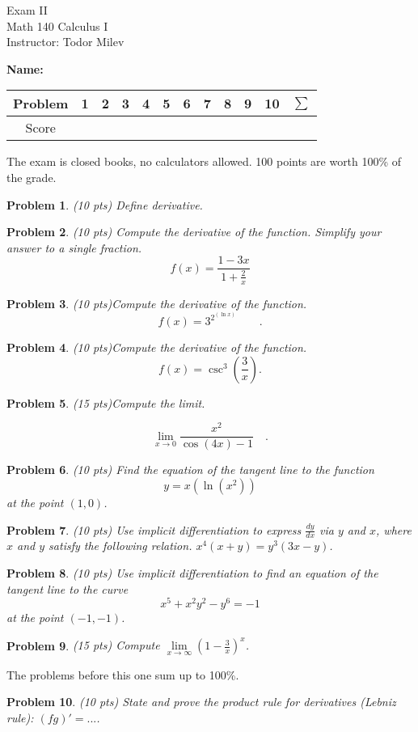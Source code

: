 \documentclass{article}
\newtheorem{problem}{Problem}
\begin{document}
\begin{center}
\Large
Exam II\\ Math 140 Calculus I \\ \normalsize Instructor: Todor Milev
\end{center}

\noindent \textbf{Name:} \hfill{~}
\begin{tabular}{c|c|c|c|c|c|c|c|c|c|c||c}
Problem&1 &2&3&4&5&6&7&8&9&10& $\sum$\\\hline
Score&&&&&&&&&&&
\end{tabular}

\noindent The exam is closed books, no calculators allowed. 100 points are worth 100\% of the grade.
\begin{problem}(10 pts) Define derivative.
\end{problem}

\vskip 8cm

\begin{problem}(10 pts)
Compute the derivative of the function. Simplify your answer to a single fraction.
\[f(x)=\frac{1-3x }{1+\frac{2}x}
\]
\end{problem}
\newpage
\begin{problem}(10 pts)Compute the derivative of the function.
\[
f(x)=3^{2^{(\ln x)}}\quad \quad.
\]
\end{problem}
\vskip 9cm

\begin{problem}(10 pts)Compute the derivative of the function.
\[f(x)= \csc^3 \left(\frac{3}{x}\right).
\]
\end{problem}

\newpage

\begin{problem}(15 pts)Compute the limit.

\[\lim\limits_{x\to 0}
\frac{x^2}{\cos(4x) -1} \quad .
\]

\end{problem}
\vskip 9cm


\begin{problem}(10 pts)
Find the equation of the tangent line to the function
\[
y=x(\ln (x^2))
\]
at the point $(1, 0)$.
\end{problem}

\newpage

\begin{problem}(10 pts)
Use implicit differentiation to express $\frac{dy}{dx}$ via $y $ and $x$, where $x$ and $y$ satisfy the following relation.
$x^4(x+y)=y^3(3x-y)$.
\end{problem}
\vskip 9cm

\begin{problem}(10 pts)
Use implicit differentiation to find an equation of the tangent line to the curve
\[
x^{5}+x^{2}y^2 -y^6=-1
\]
at the point $(-1, -1)$.
\end{problem}
\newpage
\begin{problem}(15 pts)
Compute $\lim\limits_{x\to \infty} \left( 1- \frac{3}{x} \right)^x$.
\end{problem}
\vskip 9cm
The problems before this one sum up to 100\%.
\begin{problem}(10 pts)
State and prove the product rule for derivatives (Lebniz rule): $(fg)'=...$.
\end{problem}
\end{document}
